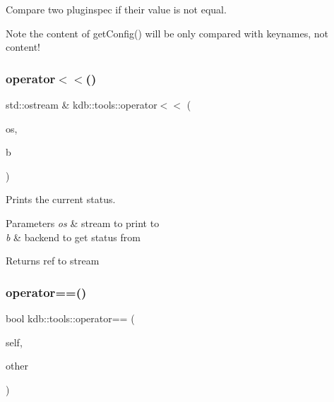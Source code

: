 Compare two pluginspec if their value is not equal. 

\begin{DoxyNote}{Note}
the content of get\+Config() will be only compared with keynames, not content! 
\end{DoxyNote}
\mbox{\label{namespacekdb_1_1tools_a10b59213ee542e33c7ecc481d4476a79}} 
\subsubsection{\texorpdfstring{operator$<$$<$()}{operator<<()}}
{\footnotesize\ttfamily std\+::ostream \& kdb\+::tools\+::operator$<$$<$ (\begin{DoxyParamCaption}\item[{std\+::ostream \&}]{os,  }\item[{\hyperlink{classkdb_1_1tools_1_1Backend}{Backend} const \&}]{b }\end{DoxyParamCaption})}



Prints the current status. 


\begin{DoxyParams}{Parameters}
{\em os} & stream to print to \\
\hline
{\em b} & backend to get status from\\
\hline
\end{DoxyParams}
\begin{DoxyReturn}{Returns}
ref to stream 
\end{DoxyReturn}
\mbox{\label{namespacekdb_1_1tools_a6f0740b75d32bfea4ef285e18b9a52f4}} 
\subsubsection{\texorpdfstring{operator==()}{operator==()}}
{\footnotesize\ttfamily bool kdb\+::tools\+::operator== (\begin{DoxyParamCaption}\item[{\hyperlink{classkdb_1_1tools_1_1PluginSpec}{Plugin\+Spec} const \&}]{self,  }\item[{\hyperlink{classkdb_1_1tools_1_1PluginSpec}{Plugin\+Spec} const \&}]{other }\end{DoxyParamCaption})}




